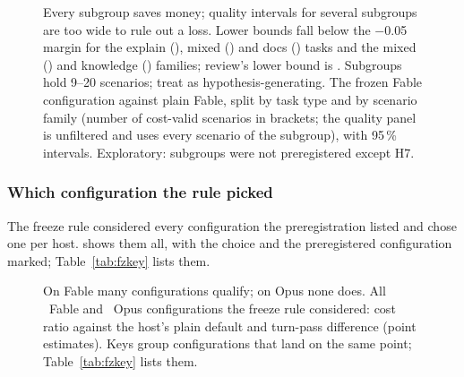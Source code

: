 \begin{figure}[htbp]
\centering
{}\par\smallskip

\caption{Every subgroup saves money; quality intervals for several subgroups are too wide to rule out a loss. Lower bounds fall below the $-$0.05 margin for the explain (\SubExplainTaskLow), mixed (\SubMixedTaskLow) and docs (\SubDocsTaskLow) tasks and the mixed (\SubMixedFamilyLow) and knowledge (\SubKnowledgeFamilyLow) families; review's lower bound is \SubReviewTaskLow. Subgroups hold 9--20 scenarios; treat as hypothesis-generating. The frozen Fable configuration against plain Fable, split by task type and by scenario family (number of
cost-valid scenarios in brackets; the quality panel is unfiltered and uses every scenario of the subgroup), with 95\,\%
intervals. Exploratory: subgroups were not preregistered except H7.}
\label{fig:subgroups}
\end{figure}

\subsubsection{Which configuration the rule picked}

The freeze rule considered every configuration the preregistration listed and chose one per host.  shows them all, with the choice and the preregistered configuration marked; Table~\ref{tab:fzkey} lists them.

\begin{figure}[htbp]
\centering
{}\par\smallskip
{}\par\medskip
{}
\caption{On Fable many configurations qualify; on Opus none does. All \FzFableN\ Fable and \FzOpusN\ Opus configurations the freeze rule considered: cost ratio against the
host's plain default and turn-pass difference (point estimates). Keys group configurations that land on the same
point; Table~\ref{tab:fzkey} lists them.}
\label{fig:fz}
\end{figure}

